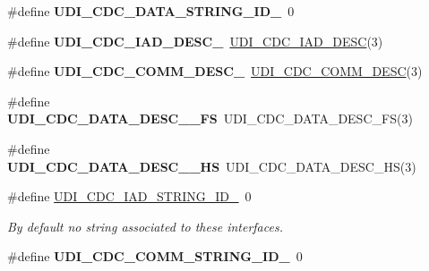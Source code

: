 \begin{DoxyCompactItemize}
\item 
\hypertarget{group__udi__cdc__group__desc_ga1bfc43c7815e4334e3e153629c575cb1}{\#define {\bfseries U\-D\-I\-\_\-\-C\-D\-C\-\_\-\-D\-A\-T\-A\-\_\-\-S\-T\-R\-I\-N\-G\-\_\-\-I\-D\-\_}~0}\label{group__udi__cdc__group__desc_ga1bfc43c7815e4334e3e153629c575cb1}

\item 
\hypertarget{group__udi__cdc__group__desc_gaf9745930276c3eb44b11c01a524792ec}{\#define {\bfseries U\-D\-I\-\_\-\-C\-D\-C\-\_\-\-I\-A\-D\-\_\-\-D\-E\-S\-C\-\_}~\hyperlink{group__udi__cdc__group__desc_ga39928ecb0423aff5f7ab70ae98eb2c94}{U\-D\-I\-\_\-\-C\-D\-C\-\_\-\-I\-A\-D\-\_\-\-D\-E\-S\-C}(3)}\label{group__udi__cdc__group__desc_gaf9745930276c3eb44b11c01a524792ec}

\item 
\hypertarget{group__udi__cdc__group__desc_ga95fee430d9244ddd37600e11b52cb0e6}{\#define {\bfseries U\-D\-I\-\_\-\-C\-D\-C\-\_\-\-C\-O\-M\-M\-\_\-\-D\-E\-S\-C\-\_}~\hyperlink{group__udi__cdc__group__desc_gac76fc1207bccd36e9851945206c063c0}{U\-D\-I\-\_\-\-C\-D\-C\-\_\-\-C\-O\-M\-M\-\_\-\-D\-E\-S\-C}(3)}\label{group__udi__cdc__group__desc_ga95fee430d9244ddd37600e11b52cb0e6}

\item 
\hypertarget{group__udi__cdc__group__desc_ga5f2d384bf1c7370757d0c66355eecc2b}{\#define {\bfseries U\-D\-I\-\_\-\-C\-D\-C\-\_\-\-D\-A\-T\-A\-\_\-\-D\-E\-S\-C\-\_\-\_\-\-F\-S}~U\-D\-I\-\_\-\-C\-D\-C\-\_\-\-D\-A\-T\-A\-\_\-\-D\-E\-S\-C\-\_\-\-F\-S(3)}\label{group__udi__cdc__group__desc_ga5f2d384bf1c7370757d0c66355eecc2b}

\item 
\hypertarget{group__udi__cdc__group__desc_ga7f3431ad4d1df2aa68390de354647e43}{\#define {\bfseries U\-D\-I\-\_\-\-C\-D\-C\-\_\-\-D\-A\-T\-A\-\_\-\-D\-E\-S\-C\-\_\-\_\-\-H\-S}~U\-D\-I\-\_\-\-C\-D\-C\-\_\-\-D\-A\-T\-A\-\_\-\-D\-E\-S\-C\-\_\-\-H\-S(3)}\label{group__udi__cdc__group__desc_ga7f3431ad4d1df2aa68390de354647e43}

\item 
\hypertarget{group__udi__cdc__group__desc_ga2560fada70bb61b21457377571aa2fb4}{\#define \hyperlink{group__udi__cdc__group__desc_ga2560fada70bb61b21457377571aa2fb4}{U\-D\-I\-\_\-\-C\-D\-C\-\_\-\-I\-A\-D\-\_\-\-S\-T\-R\-I\-N\-G\-\_\-\-I\-D\-\_}~0}\label{group__udi__cdc__group__desc_ga2560fada70bb61b21457377571aa2fb4}

\begin{DoxyCompactList}\small\item\em By default no string associated to these interfaces. \end{DoxyCompactList}\item 
\hypertarget{group__udi__cdc__group__desc_ga0ab29945df575394e2ad525c3cfb1eb4}{\#define {\bfseries U\-D\-I\-\_\-\-C\-D\-C\-\_\-\-C\-O\-M\-M\-\_\-\-S\-T\-R\-I\-N\-G\-\_\-\-I\-D\-\_}~0}\label{group__udi__cdc__group__desc_ga0ab29945df575394e2ad525c3cfb1eb4}


\end{DoxyCompactItemize}
